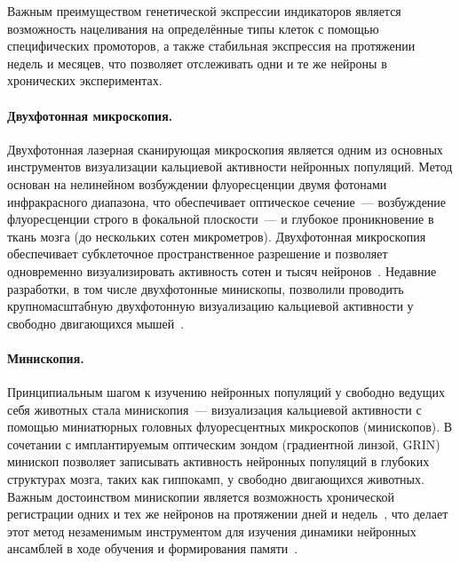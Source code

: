 Важным преимуществом генетической экспрессии индикаторов является возможность нацеливания на определённые типы клеток с помощью специфических промоторов, а также стабильная экспрессия на протяжении недель и месяцев, что позволяет отслеживать одни и те же нейроны в хронических экспериментах.

\paragraph{Двухфотонная микроскопия.}
Двухфотонная лазерная сканирующая микроскопия является одним из основных инструментов визуализации кальциевой активности нейронных популяций. Метод основан на нелинейном возбуждении флуоресценции двумя фотонами инфракрасного диапазона, что обеспечивает оптическое сечение~--- возбуждение флуоресценции строго в фокальной плоскости~--- и глубокое проникновение в ткань мозга (до нескольких сотен микрометров). Двухфотонная микроскопия обеспечивает субклеточное пространственное разрешение и позволяет одновременно визуализировать активность сотен и тысяч нейронов~\cite{Pachitariu2017}. Недавние разработки, в том числе двухфотонные минископы, позволили проводить крупномасштабную двухфотонную визуализацию кальциевой активности у свободно двигающихся мышей~\cite{Zong2022}.

\paragraph{Минископия.}
Принципиальным шагом к изучению нейронных популяций у свободно ведущих себя животных стала минископия~--- визуализация кальциевой активности с помощью миниатюрных головных флуоресцентных микроскопов (минископов). В сочетании с имплантируемым оптическим зондом (градиентной линзой, GRIN) минископ позволяет записывать активность нейронных популяций в глубоких структурах мозга, таких как гиппокамп, у свободно двигающихся животных. Важным достоинством минископии является возможность хронической регистрации одних и тех же нейронов на протяжении дней и недель~\cite{Sheintuch2017}, что делает этот метод незаменимым инструментом для изучения динамики нейронных ансамблей в ходе обучения и формирования памяти~\cite{Sotskov2022}.

